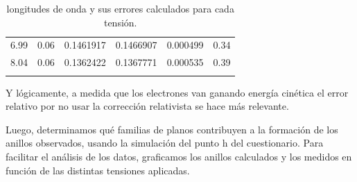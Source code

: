 \documentclass[]{article}
\begin{document}
\begin{longtable}[]{@{}llllll@{}}
\begin{minipage}[t]{0.12\columnwidth}
6.99\strut
\end{minipage} & \begin{minipage}[t]{0.16\columnwidth}\raggedright
0.06\strut
\end{minipage} & \begin{minipage}[t]{0.21\columnwidth}\raggedright
0.1461917\strut
\end{minipage} & \begin{minipage}[t]{0.14\columnwidth}\raggedright
0.1466907\strut
\end{minipage} & \begin{minipage}[t]{0.13\columnwidth}\raggedright
0.000499\strut
\end{minipage} & \begin{minipage}[t]{0.08\columnwidth}\raggedright
0.34\strut
\end{minipage}\tabularnewline
\begin{minipage}[t]{0.12\columnwidth}\raggedright
8.04\strut
\end{minipage} & \begin{minipage}[t]{0.16\columnwidth}\raggedright
0.06\strut
\end{minipage} & \begin{minipage}[t]{0.21\columnwidth}\raggedright
0.1362422\strut
\end{minipage} & \begin{minipage}[t]{0.14\columnwidth}\raggedright
0.1367771\strut
\end{minipage} & \begin{minipage}[t]{0.13\columnwidth}\raggedright
0.000535\strut
\end{minipage} & \begin{minipage}[t]{0.08\columnwidth}\raggedright
0.39\strut
\end{minipage}\tabularnewline
\bottomrule
\caption{longitudes de onda y sus errores calculados para cada
tensión.}\tabularnewline
\end{longtable}

Y lógicamente, a medida que los electrones van ganando energía cinética
el error relativo por no usar la corrección relativista se hace más
relevante.

Luego, determinamos qué familias de planos contribuyen a la formación de
los anillos observados, usando la simulación del punto h del
cuestionario. Para facilitar el análisis de los datos, graficamos los
anillos calculados y los medidos en función de las distintas tensiones
aplicadas.
\end{document}

